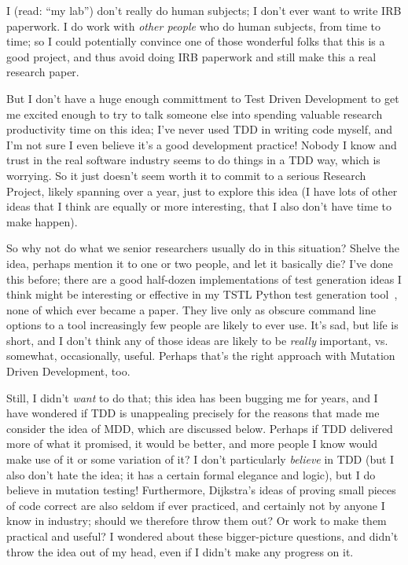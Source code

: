 \documentclass[sigplan,screen]{acmart}
\begin{document}
I (read: ``my lab'') don't really do human subjects; I don't ever want to
write IRB paperwork.  I do work with \emph{other people} who do human subjects,
from time to time; so I could potentially convince one of those
wonderful folks that this is a good project, and thus avoid doing IRB
paperwork and still make this a real research paper.

But I don't have a huge enough committment to Test
Driven Development to get me excited enough to try to talk someone
else into spending valuable research productivity time on this idea; I've never used
TDD in writing code myself, and I'm not sure I even believe it's a good development
practice!  Nobody I know and trust in the real software industry seems
to do things in a TDD way, which is worrying.  So it just doesn't
seem worth it to commit to a serious Research Project, likely spanning
over a year, just to explore this idea (I have lots of other ideas
that I think are equally or more interesting, that I also don't have
time to make happen).

So why not do what we senior researchers usually do in this situation?
Shelve the idea, perhaps mention it to one or two people, and let it
basically die?  I've done this before; there are a good half-dozen
implementations of test generation ideas I think might be interesting
or effective in my TSTL Python test generation tool~\cite{tstlsttt}, none of which
ever became a paper.  They live only as obscure command line options
to a tool increasingly few people are likely to ever use.  It's sad,
but life is short, and I don't think any of those ideas are likely to
be \emph{really} important, vs. somewhat, occasionally, useful.
Perhaps that's the right approach with Mutation Driven Development,
too.

Still, I didn't \emph{want} to do that; this idea has been bugging me
for years, and I have wondered if TDD is unappealing precisely for the
reasons that made me consider the idea of MDD, which are discussed
below.  Perhaps if TDD delivered more of what it promised, it would be
better, and more people I know would make use of it or some variation
of it?  I don't particularly \emph{believe} in TDD (but I also don't hate
the idea; it has a certain formal elegance and logic), but I do
believe in mutation testing!  Furthermore, Dijkstra's ideas of proving small pieces of code correct are
also seldom if ever practiced, and certainly not by anyone I know in industry; should we
therefore throw them out?  Or work to make them practical and useful?
I wondered about these bigger-picture questions, and didn't throw the idea out of my head, even if I didn't
make any progress on it.
\end{document}
